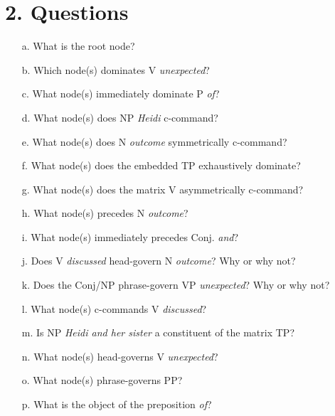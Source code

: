 \documentclass[11pt]{article}
\begin{document}
\section{2. Questions}
\bigskip
\begin{enumerate}
  \setlength{\itemsep}{1.5\itemsep}
  \item [a.] What is the root node? 
  \item [b.] Which node(s) dominates V \textit{unexpected}? 
  \item [c.] What node(s) immediately dominate P \textit{of}?
  \item [d.] What node(s) does NP \textit{Heidi} c-command?
  \item [e.] What node(s) does N \textit{outcome} symmetrically c-command?
  \item [f.] What node(s) does the embedded TP exhaustively dominate?
  \item [g.] What node(s) does the matrix V asymmetrically c-command?
  \item [h.] What node(s) precedes N \textit{outcome}?
  \item [i.] What node(s) immediately precedes Conj. \textit{and}?
  \item [j.] Does V \textit{discussed} head-govern N \textit{outcome}? Why or why not?
  \item [k.] Does the Conj/NP phrase-govern VP \textit{unexpected}? Why or why not?
  \item [l.] What node(s) c-commands V \textit{discussed}?
  \item [m.] Is NP \textit{Heidi and her sister} a constituent of the matrix TP?
  \item [n.] What node(s) head-governs V \textit{unexpected}? 
  \item [o.] What node(s) phrase-governs PP?
  \item [p.] What is the object of the preposition \textit{of}?
\end{enumerate}

\newpage
\end{document}
